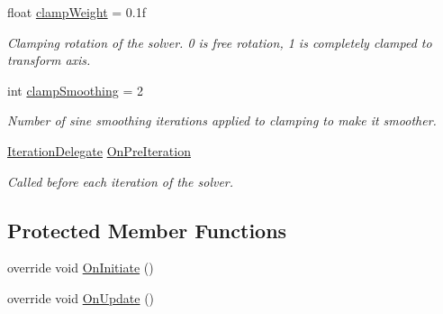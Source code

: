 \begin{DoxyCompactItemize}
float \mbox{\hyperlink{class_root_motion_1_1_final_i_k_1_1_i_k_solver_aim_a395cfdc5139757e70fb71f8d895f0a25}{clamp\+Weight}} = 0.\+1f
\begin{DoxyCompactList}\small\item\em Clamping rotation of the solver. 0 is free rotation, 1 is completely clamped to transform axis. \end{DoxyCompactList}\item 
int \mbox{\hyperlink{class_root_motion_1_1_final_i_k_1_1_i_k_solver_aim_a5649fc7443e8a63e25216ca67f872301}{clamp\+Smoothing}} = 2
\begin{DoxyCompactList}\small\item\em Number of sine smoothing iterations applied to clamping to make it smoother. \end{DoxyCompactList}\item 
\mbox{\hyperlink{class_root_motion_1_1_final_i_k_1_1_i_k_solver_ae3da6a8ccd8224ce56d15c4da5cd1ef7}{Iteration\+Delegate}} \mbox{\hyperlink{class_root_motion_1_1_final_i_k_1_1_i_k_solver_aim_ad224be6292bc0e6e01979d89ac2d5e11}{On\+Pre\+Iteration}}
\begin{DoxyCompactList}\small\item\em Called before each iteration of the solver. \end{DoxyCompactList}\end{DoxyCompactItemize}
\subsection*{Protected Member Functions}
\begin{DoxyCompactItemize}
\item 
override void \mbox{\hyperlink{class_root_motion_1_1_final_i_k_1_1_i_k_solver_aim_ab758f8eb82d72511af5619e483d35f72}{On\+Initiate}} ()
\item 
override void \mbox{\hyperlink{class_root_motion_1_1_final_i_k_1_1_i_k_solver_aim_a828674d8e72e508f17bd64a7404c430e}{On\+Update}} ()
\end{DoxyCompactItemize}
